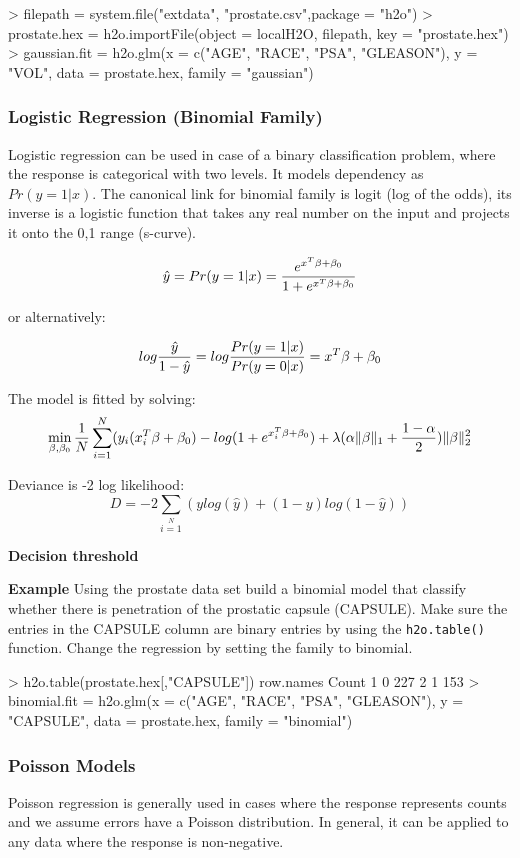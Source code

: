 \documentclass[11pt]{article}
\begin{document}
\begin{spverbatim}
> filepath = system.file("extdata", "prostate.csv",package = "h2o")
> prostate.hex = h2o.importFile(object = localH2O, filepath, key = "prostate.hex")
> gaussian.fit = h2o.glm(x = c("AGE", "RACE", "PSA", "GLEASON"), y = "VOL", data = prostate.hex, family = "gaussian")
\end{spverbatim}

\subsubsection{Logistic Regression (Binomial Family)}
Logistic regression can be used in case of a binary classification problem, where the response is categorical with two levels. It models dependency as $Pr(y = 1|x)$. The canonical link for binomial family is logit (log of the odds), its inverse is a logistic function that takes any real number on the input and projects it onto the 0,1 range (s-curve). 

\[ \hat{y} = Pr(y = 1|x) = {e^{x^T\beta + \beta_0} \over 1 + e^{x^T \beta + \beta_0} } \]

or alternatively:


\[log {\hat{y} \over 1- \hat{y}} = log{Pr(y=1|x) \over Pr(y=0|x)} = x^T \beta + \beta_0\]

The model is fitted by solving:
\[  \min\limits_{\beta,\beta_0} { {1 \over N}\sum\limits_{i=1}\limits^{N}(y_i (x_i^{T}\beta  + \beta_0) - log (1 + e^{x_i^{T}\beta  + \beta_0} )  + \lambda (\alpha \|\beta \|_1 + {1-\alpha \over 2}) \| \beta \|_2^2} \]

Deviance is -2 log likelihood:
\[D = -2\sum\limits_{i=1}\limits^{N}{(y log(\hat{y}) + (1 - y)log(1-\hat{y})  )}\]

\textbf{Decision threshold}

\textbf{Example}
Using the prostate data set build a binomial model that classify whether there is penetration of the prostatic capsule (CAPSULE). Make sure the entries in the CAPSULE column are binary entries by using the \texttt{h2o.table()} function. Change the regression by setting the family to binomial.
\begin{spverbatim}
> h2o.table(prostate.hex[,"CAPSULE"])
  row.names Count
1         0   227
2         1   153
> binomial.fit = h2o.glm(x = c("AGE", "RACE", "PSA", "GLEASON"), y = "CAPSULE", data = prostate.hex, family = "binomial")
\end{spverbatim}

\subsubsection{Poisson Models}
Poisson regression is generally used in cases where the response represents counts and we assume errors have a Poisson distribution. In general, it can be applied to any data where the response is non-negative. 
\end{document}
